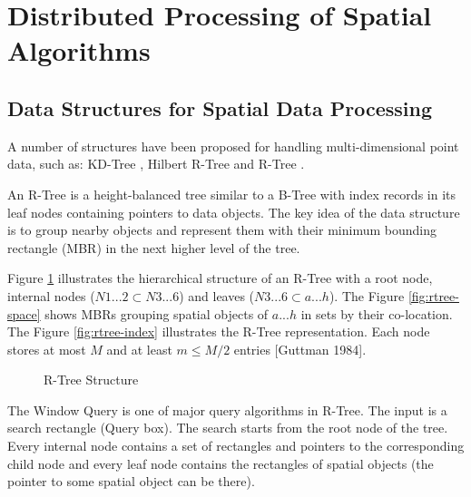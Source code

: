 \section{Distributed Processing of Spatial Algorithms}
\label{sec:spatial_dist}

\subsection{Data Structures for Spatial Data Processing}
\label{sub:spatialdata}		
A number of structures have been proposed for handling multi-dimensional point data, such as: KD-Tree \cite{bentley1975multidimensional}, Hilbert R-Tree \cite{kamel1994hilbert} and R-Tree \cite{guttman1984r}.

An R-Tree is a height-balanced tree similar to a B-Tree \cite{comer1979ubiquitous} with index records in its leaf nodes containing pointers to data objects. 
The key idea of the data structure is to group nearby objects and represent them with their minimum bounding rectangle (MBR) in the next higher level of the tree. 

Figure \ref{fig:rtree} illustrates the hierarchical structure of an R-Tree with a root node, internal nodes ($N1...2 \subset N3...6$) and leaves ($N3...6 \subset a...h$). 
The Figure \ref{fig:rtree-space} shows MBRs grouping spatial objects of $a...h$ in sets by their co-location. 
The Figure \ref{fig:rtree-index} illustrates the R-Tree representation. Each node stores at most $M$ and at least $m \leq M/2$ entries [Guttman 1984].

\begin{figure}[h]
  \centering
   \qquad
  \caption{R-Tree Structure}
  \label{fig:rtree}
\end{figure}

The Window Query is one of major query algorithms in R-Tree. The input is a search rectangle (Query box). The search starts from the root node of the tree. 
Every internal node contains a set of rectangles and pointers to the corresponding child node and every leaf node contains the rectangles of spatial objects (the pointer to some spatial object can be there). 

